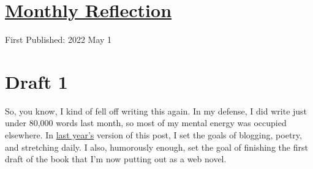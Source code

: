 \documentclass[12pt]{article}[titlepage]
\renewcommand{\,}{\textsuperscript{,}}
\begin{document}
\doublespacing
\section{\href{reflection-april-23.html}{Monthly Reflection}}
First Published: 2022 May 1

\section{Draft 1}
So, you know, I kind of fell off writing this again.
In my defense, I did write just under 80,000 words last month, so most of my mental energy was occupied elsewhere.
In \href{reflection-april-2022.html}{last year's} version of this post, I set the goals of blogging, poetry, and stretching daily.
I also, humorously enough, set the goal of finishing the first draft of the book that I'm now putting out as a web novel.
\end{document}
